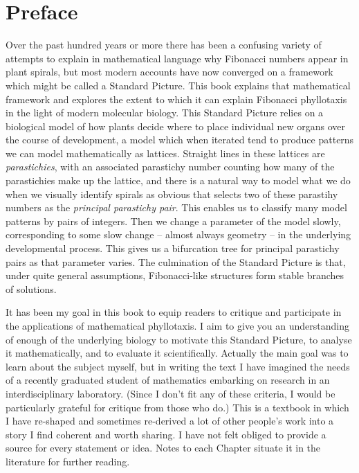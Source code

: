 

\chapter*{Preface}


Over the past hundred years or more there has been a confusing variety of attempts to explain in mathematical language why Fibonacci numbers appear in plant spirals, but most modern accounts have now converged on a framework which might be called a Standard Picture. This book explains that mathematical framework and explores the extent to which it can explain Fibonacci phyllotaxis in the light of modern molecular biology.
 This Standard Picture relies on a biological model of how plants decide where to place individual new  organs over the course of development,
a model which when iterated tend to produce patterns we can model mathematically as lattices. Straight lines in these lattices are \textit{parastichies}, with an associated parastichy number counting how many of the parastichies make up the lattice, and there is a natural way to model what we do when we visually identify spirals as obvious that selects two of these parastihy numbers as the \textit{principal parastichy pair}.  This enables us to classify many model patterns by pairs of integers. Then we change a parameter of the model slowly, corresponding to some slow change -- almost always geometry -- in the underlying developmental process. This gives us a bifurcation tree for principal parastichy pairs as that parameter varies. The culmination of the Standard Picture is that, under quite general assumptions, Fibonacci-like structures form  stable branches of solutions.

It has been my goal in this book to equip readers to critique and participate in the applications of mathematical phyllotaxis.  I aim to give you an understanding of enough of the underlying biology to motivate this Standard Picture, to analyse it mathematically, and to evaluate it scientifically. Actually the main goal was to learn about the subject myself, but in writing the text I have imagined the needs of a recently graduated student of mathematics embarking on research in an interdisciplinary laboratory. (Since I don't fit any of these criteria, I would be particularly grateful for critique from those who do.) This is a textbook in which I have re-shaped and sometimes  re-derived a lot of other people's work into a story I find coherent and worth sharing. I have not felt obliged to provide a source for every statement or idea. Notes to each Chapter situate it in the literature for further reading. 



